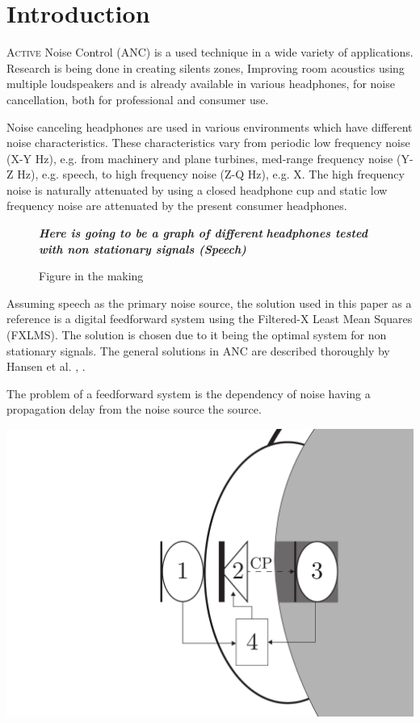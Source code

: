 \section{Introduction}
\lettrine[lines=2]{A}{ctive} Noise Control (ANC) is a used technique in a wide variety of applications. Research is being done in creating silents zones\cite{SilentZones}, Improving room acoustics using multiple loudspeakers\cite{CAPS} and is already available in various headphones, for noise cancellation, both for professional and consumer use. 

Noise canceling headphones are used in various environments which have different noise characteristics. These characteristics vary from periodic low frequency noise (X-Y Hz), e.g. from machinery and plane turbines\cite{LowFrequency}, med-range frequency noise (Y-Z Hz), e.g. speech\cite{MidFrequency}, to high frequency noise (Z-Q Hz), e.g. X\cite{HighFrequency}. The high frequency noise is naturally attenuated by using a closed headphone cup\cite{naturalAttenuation} and static low frequency noise are attenuated by the present consumer headphones\cite{ConsumerANC}.

\begin{figure}[H]
	\centering
	\textbf{\textit{Here is going to be a graph of different}}
	\textbf{\textit{ headphones tested with non stationary signals (Speech)}}
	\caption{Figure in the making}
\end{figure}


Assuming speech as the primary noise source, the solution used in this paper as a reference is a digital feedforward system using the Filtered-X Least Mean Squares (FXLMS). The solution is chosen due to it being the optimal system for non stationary signals. The general solutions in ANC are described thoroughly by Hansen et al. \cite{Hansen2}, \cite{Hansen}.

The problem of a feedforward system is the dependency of noise having a propagation delay from the noise source the source. 

{
	\centering
	\includegraphics[width=0.5\columnwidth]{figures/ArticleIllustrations/BasicOverviewZoomed}
	\label{fig:SystemOverview}
}

